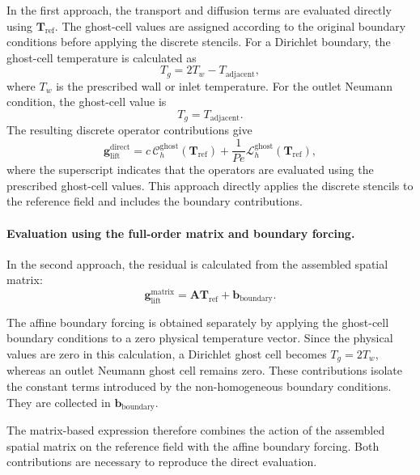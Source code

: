 In the first approach, the transport and diffusion terms
are evaluated directly using $\mathbf{T}_{\mathrm{ref}}$.
The ghost-cell values are assigned according to the original
boundary conditions before applying the discrete stencils.
For a Dirichlet boundary, the ghost-cell temperature is
calculated as
\[
T_g=2T_w-T_{\mathrm{adjacent}},
\]
where $T_w$ is the prescribed wall or inlet temperature.
For the outlet Neumann condition, the ghost-cell value is
\[
T_g=T_{\mathrm{adjacent}}.
\]
The resulting discrete operator contributions give
\begin{equation}
    \mathbf{g}_{\mathrm{lift}}^{\mathrm{direct}}
    =
    c\,\mathcal{C}_h^{\mathrm{ghost}}
    (\mathbf{T}_{\mathrm{ref}})
    +
    \frac{1}{Pe}
    \mathcal{L}_h^{\mathrm{ghost}}
    (\mathbf{T}_{\mathrm{ref}}),
    \label{eq:direct_lifting_evaluation}
\end{equation}
where the superscript indicates that the operators are
evaluated using the prescribed ghost-cell values. This
approach directly applies the discrete stencils to the
reference field and includes the boundary contributions.

\paragraph{Evaluation using the full-order matrix and boundary forcing.}

In the second approach, the residual is calculated from
the assembled spatial matrix:
\begin{equation}
    \boxed{
    \mathbf{g}_{\mathrm{lift}}^{\mathrm{matrix}}
    =
    \mathbf{A}\mathbf{T}_{\mathrm{ref}}
    +\mathbf{b}_{\mathrm{boundary}}.
    }
    \label{eq:matrix_lifting_evaluation}
\end{equation}

The affine boundary forcing is obtained separately by
applying the ghost-cell boundary conditions to a zero
physical temperature vector. Since the physical values
are zero in this calculation, a Dirichlet ghost cell
becomes $T_g=2T_w$, whereas an outlet Neumann ghost cell
remains zero. These contributions isolate the constant
terms introduced by the non-homogeneous boundary
conditions. They are collected in
$\mathbf{b}_{\mathrm{boundary}}$.

The matrix-based expression therefore combines the action
of the assembled spatial matrix on the reference field
with the affine boundary forcing. Both contributions are
necessary to reproduce the direct evaluation.

